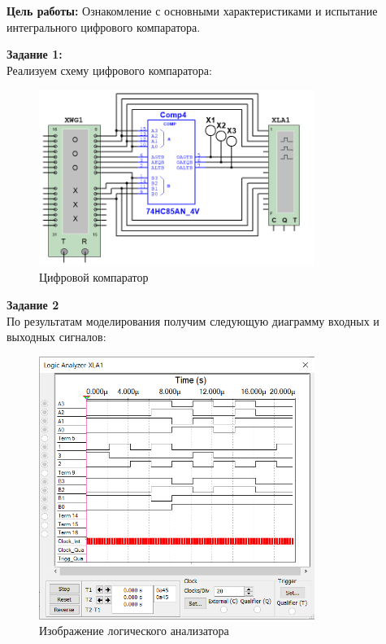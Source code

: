 \documentclass[spec, och, labwork]{shiza}
\begin{document}



\textbf{Цель работы:} Ознакомление с основными характеристиками и испытание интегрального цифрового компаратора.

\textbf{Задание 1:}\\
Реализуем схему цифрового компаратора:

\begin{figure}[H]
    \centering
    \includegraphics[width=0.8\textwidth]{pic3/1.png}
    \caption{Цифровой компаратор}
\end{figure}

\textbf{Задание 2}\\

По результатам моделирования получим следующую диаграмму входных и выходных сигналов:

\begin{figure}[H]
    \centering
    \includegraphics[width=0.8\textwidth]{pic3/2.png}
    \caption{Изображение логического анализатора}
\end{figure}
\end{document}
